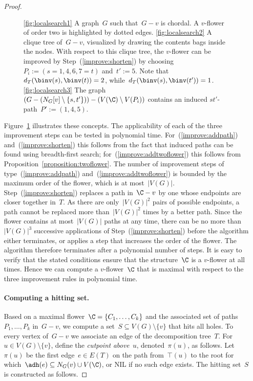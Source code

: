 \begin{proof}
\begin{figure}[t]
\begin{center}
\caption{\ref{fig:localsearch1} A graph~$G$ such that~$G-v$ is chordal. A $v$-flower of order two is highlighted by dotted edges. \ref{fig:localsearch2} A clique tree of~$G-v$, visualized by drawing the contents bags inside the nodes. With respect to this clique tree, the $v$-flower can be improved by Step~(\ref{improve:shorten}) by choosing~$P_i := (s=1,4,6,7=t)$ and~$t' := 5$. Note that~$d_T(\binv(s), \binv(t)) = 2$, while~$d_T(\binv(s),\binv(t')) = 1$. \ref{fig:localsearch3} The graph~$(G - (N_G[v] \setminus \{s,t'\})) - (V(\C) \setminus V(P_i))$ contains an induced $st'$-path~$P' := (1,4,5)$.} \label{fig:localsearch}
\end{center}
\end{figure}

Figure~\ref{fig:localsearch} illustrates these concepts. The applicability of each of the three improvement steps can be tested in polynomial time. For~(\ref{improve:addpath}) and~(\ref{improve:shorten}) this follows from the fact that induced paths can be found using breadth-first search; for~(\ref{improve:addtwoflower}) this follows from Proposition~\ref{proposition:twoflower}. The number of improvement steps of type~(\ref{improve:addpath}) and~(\ref{improve:addtwoflower}) is bounded by the maximum order of the flower, which is at most~$|V(G)|$. Step~(\ref{improve:shorten}) replaces a path in~$\C - v$ by one whose endpoints are closer together in~$T$. As there are only~$|V(G)|^2$ pairs of possible endpoints, a path cannot be replaced more than~$|V(G)|^2$ times by a better path. Since the flower contains at most~$|V(G)|$ paths at any time, there can be no more than~$|V(G)|^3$ successive applications of Step~(\ref{improve:shorten}) before the algorithm either terminates, or applies a step that increases the order of the flower. The algorithm therefore terminates after a polynomial number of steps. It is easy to verify that the stated conditions ensure that the structure~$\C$ is a $v$-flower at all times. Hence we can compute a $v$-flower~$\C$ that is maximal with respect to the three improvement rules in polynomial time.

\paragraph{Computing a hitting set.} Based on a maximal flower~$\C = \{C_1, \ldots, C_k\}$ and the associated set of paths~$P_1, \ldots, P_k$ in~$G - v$, we compute a set~$S \subseteq V(G) \setminus \{v\}$ that hits all holes. To every vertex of~$G - v$ we associate an edge of the decomposition tree~$T$. For~$u \in V(G) \setminus \{v\}$, define the \emph{cutpoint above~$u$}, denoted~$\pi(u)$, as follows. Let~$\pi(u)$ be the first edge~$e \in E(T)$ on the path from~$\top(u)$ to the root for which~$\adh(e) \subseteq N_G(v) \cup V(\C)$, or NIL if no such edge exists. The hitting set~$S$ is constructed as follows.


\end{proof}
